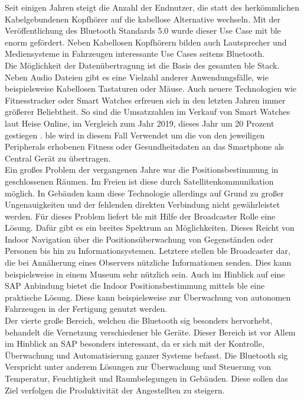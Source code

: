 \noindent Seit einigen Jahren steigt die Anzahl der Endnutzer, die statt des herkömmlichen Kabelgebundenen Kopfhörer auf die kabellose Alternative wechseln. Mit der Veröffentlichung des Bluetooth Standards 5.0 wurde dieser Use Case mit \ac{ble} enorm gefördert. Neben Kabellosen Kopfhörern bilden auch Lautsprecher und Mediensysteme in Fahrzeugen interessante Use Cases seitens Bluetooth.\\

\noindent Die Möglichkeit der Datenübertragung ist die Basis des gesamten \ac{ble} Stack. Neben Audio Dateien gibt es eine Vielzahl anderer Anwendungsfälle, wie beispielsweise Kabellosen Tastaturen oder Mäuse. Auch neuere Technologien wie Fitnesstracker oder Smart Watches erfreuen sich in den letzten Jahren immer größerer Beliebtheit. So sind die Umsatzzahlen im Verkauf von Smart Watches laut Heise Online, im Vergleich zum Jahr 2019, dieses Jahr um 20 Prozent gestiegen \cite{HEI20:WWW}. \ac{ble} wird in diesem Fall Verwendet um die von den jeweiligen Peripherals erhobenen Fitness oder Gesundheitsdaten an das Smartphone als Central Gerät zu übertragen.\\

\noindent Ein großes Problem der vergangenen Jahre war die Positionsbestimmung in geschlossenen Räumen. Im Freien ist diese durch Satellitenkommunikation möglich. In Gebäuden kann diese Technologie allerdings auf Grund zu großer Ungenauigkeiten und der fehlenden direkten Verbindung nicht gewährleistet werden. Für dieses Problem liefert \ac{ble} mit Hilfe der Broadcaster Rolle eine Lösung. Dafür gibt es ein breites Spektrum an Möglichkeiten. Dieses Reicht von Indoor Navigation über die Positionsüberwachung von Gegenständen oder Personen bis hin zu Informationsystemen. Letztere stellen \ac{ble} Broadcaster dar, die bei Annäherung eines Observers nützliche Informationen senden. Dies kann beispielsweise in einem Museum sehr nützlich sein. Auch im Hinblick auf eine SAP Anbindung bietet die Indoor Positionsbestimmung mittels \ac{ble} eine praktische Lösung. Diese kann beispielsweise zur Überwachung von autonomen Fahrzeugen in der Fertigung genutzt werden.\\          

\noindent Der vierte große Bereich, welchen die Bluetooth \ac{sig} besonders hervorhebt, behandelt die Vernetzung verschiedener \ac{ble} Geräte. Dieser Bereich ist vor Allem im Hinblick an SAP besonders interessant, da er sich mit der Kontrolle, Überwachung und Automatisierung ganzer Systeme befasst. Die Bluetooth \ac{sig} Verspricht unter anderem Lösungen zur Überwachung und Steuerung von Temperatur, Feuchtigkeit und Raumbelegungen in Gebäuden. Diese sollen das Ziel verfolgen die Produktivität der Angestellten zu steigern.\\   

